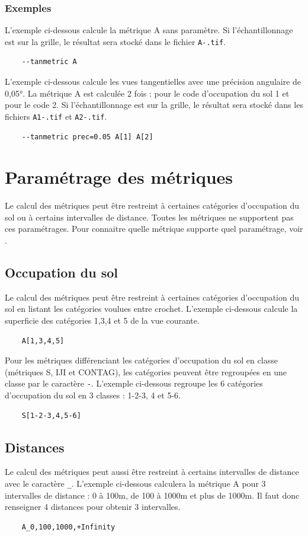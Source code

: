 \documentclass{report}
\begin{document}
\subsubsection{Exemples}

L'exemple ci-dessous calcule la métrique A sans paramètre. Si l'échantillonnage est sur la grille, le résultat sera stocké dans le fichier \verb|A-.tif|.
\begin{Verbatim}
	--tanmetric A
\end{Verbatim}

L'exemple ci-dessous calcule les vues tangentielles avec une précision angulaire de 0,05°. La métrique A est calculée 2 fois : pour le code d'occupation du sol 1 et pour le code 2. Si l'échantillonnage est sur la grille, le résultat sera stocké dans les fichiers \verb|A1-.tif| et \verb|A2-.tif|.
\begin{Verbatim}
	--tanmetric prec=0.05 A[1] A[2]
\end{Verbatim}


\section{Paramétrage des métriques}
\label{param_metrics_cli}
Le calcul des métriques peut être restreint à certaines catégories d'occupation du sol ou à certains intervalles de distance. Toutes les métriques ne supportent pas ces paramétrages. Pour connaitre quelle métrique supporte quel paramétrage, voir .

\subsection{Occupation du sol}
Le calcul des métriques peut être restreint à certaines catégories d'occupation du sol en listant les catégories voulues entre crochet. L'exemple ci-dessous calcule la superficie des catégories 1,3,4 et 5 de la vue courante.
\begin{Verbatim}
	A[1,3,4,5]
\end{Verbatim}

Pour les métriques différenciant les catégories d'occupation du sol en classe (métriques S, IJI et CONTAG), les catégories peuvent être regroupées en une classe par le caractère \verb|-|. L'exemple ci-dessous regroupe les 6 catégories d'occupation du sol en 3 classes : 1-2-3, 4 et 5-6.
\begin{Verbatim}
	S[1-2-3,4,5-6]
\end{Verbatim}

\subsection{Distances}
Le calcul des métriques peut aussi être restreint à certains intervalles de distance avec le caractère \verb|_|. L'exemple ci-dessous calculera la métrique A pour 3 intervalles de distance : 0 à 100m, de 100 à 1000m et plus de 1000m. Il faut donc renseigner 4 distances pour obtenir 3 intervalles.
\begin{Verbatim}
	A_0,100,1000,+Infinity
\end{Verbatim}
\end{document}
